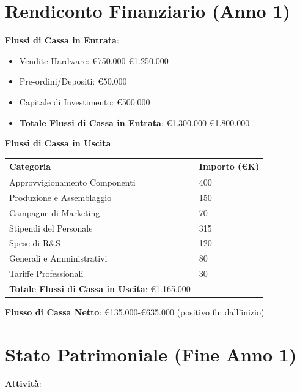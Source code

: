 \documentclass[11pt,a4paper]{report}
\begin{document}
\section{Rendiconto Finanziario (Anno 1)}

\textbf{Flussi di Cassa in Entrata}:
\begin{itemize}
    \item Vendite Hardware: €750.000-€1.250.000
    \item Pre-ordini/Depositi: €50.000
    \item Capitale di Investimento: €500.000
    \item \textbf{Totale Flussi di Cassa in Entrata}: €1.300.000-€1.800.000
\end{itemize}

\textbf{Flussi di Cassa in Uscita}:

\begin{longtable}{|p{3.5cm}|p{2cm}|}
\hline
\textbf{Categoria} & \textbf{Importo (€K)} \\ \hline
Approvvigionamento Componenti & 400 \\ \hline
Produzione e Assemblaggio & 150 \\ \hline
Campagne di Marketing & 70 \\ \hline
Stipendi del Personale & 315 \\ \hline
Spese di R\&S & 120 \\ \hline
Generali e Amministrativi & 80 \\ \hline
Tariffe Professionali & 30 \\ \hline
\textbf{Totale Flussi di Cassa in Uscita}: €1.165.000 \\ \hline
\end{longtable}

\textbf{Flusso di Cassa Netto}: €135.000-€635.000 (positivo fin dall'inizio)

\section{Stato Patrimoniale (Fine Anno 1)}

\textbf{Attività}:
\end{document}
